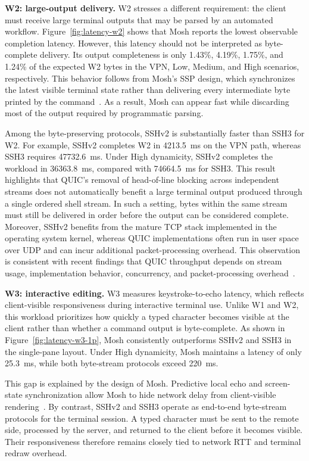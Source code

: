 \textbf{W2: large-output delivery.}
W2 stresses a different requirement: the client must receive large terminal
outputs that may be parsed by an automated workflow. Figure~\ref{fig:latency-w2}
shows that Mosh reports the lowest observable completion latency. However,
this latency should not be interpreted as byte-complete delivery. Its output
completeness is only 1.43\%, 4.19\%, 1.75\%, and 1.24\% of the expected W2
bytes in the VPN, Low, Medium, and High scenarios, respectively. This
behavior follows from Mosh's SSP design, which synchronizes the latest
visible terminal state rather than delivering every intermediate byte
printed by the command~\cite{Winstein2012}. As a result, Mosh can appear
fast while discarding most of the output required by programmatic parsing.

Among the byte-preserving protocols, SSHv2 is substantially faster than
SSH3 for W2. For example, SSHv2 completes W2 in 4213.5~ms on the VPN path,
whereas SSH3 requires 47732.6~ms. Under High dynamicity, SSHv2 completes
the workload in 36363.8~ms, compared with 74664.5~ms for SSH3. This result
highlights that QUIC's removal of head-of-line blocking across independent
streams does not automatically benefit a large terminal output produced
through a single ordered shell stream. In such a setting, bytes within the
same stream must still be delivered in order before the output can be
considered complete. Moreover, SSHv2 benefits from the mature TCP stack
implemented in the operating system kernel, whereas QUIC implementations
often run in user space over UDP and can incur additional packet-processing
overhead. This observation is consistent with recent findings that QUIC
throughput depends on stream usage, implementation behavior, concurrency,
and packet-processing overhead~\cite{Konig2025}.

\textbf{W3: interactive editing.}
W3 measures keystroke-to-echo latency, which reflects client-visible
responsiveness during interactive terminal use. Unlike W1 and W2, this
workload prioritizes how quickly a typed character becomes visible at the
client rather than whether a command output is byte-complete. As shown in
Figure~\ref{fig:latency-w3-1p}, Mosh consistently outperforms SSHv2 and
SSH3 in the single-pane layout. Under High dynamicity, Mosh maintains a
latency of only 25.3~ms, while both byte-stream protocols exceed 220~ms.

This gap is explained by the design of Mosh. Predictive local echo and
screen-state synchronization allow Mosh to hide network delay from
client-visible rendering~\cite{Winstein2012}. By contrast, SSHv2 and SSH3
operate as end-to-end byte-stream protocols for the terminal session. A
typed character must be sent to the remote side, processed by the server,
and returned to the client before it becomes visible. Their responsiveness
therefore remains closely tied to network RTT and terminal redraw overhead.

